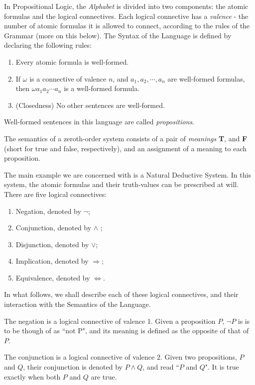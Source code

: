 In Propositional Logic, the \textit{Alphabet} is divided into two components: the atomic formulas and the logical connectives. Each logical connective has a \textit{valence} - the number of atomic formulas it is allowed to connect, according to the rules of the Grammar (more on this below). The Syntax of the Language is defined by declaring the following rules:
\begin{enumerate}
\item Every atomic formula is well-formed. 
\item If $\omega$ is a connective of valence $n$, and $a_1, a_2, \cdots, a_n$ are well-formed formulas, then $\omega a_1a_2\cdots a_n$ is a well-formed formula. 
\item (Closedness) No other sentences are well-formed.
\end{enumerate}
Well-formed sentences in this language are called \textit{propositions}.

The semantics of a zeroth-order system consists of a pair of \textit{meanings} \textbf{T}, and \textbf{F} (short for true and false, respectively), and an assignment of a meaning to each proposition. 

The main example we are concerned with is a Natural Deductive System. In this system, the atomic formulas and their truth-values can be prescribed at will. There are five logical connectives: 
\begin{enumerate}
\item Negation, denoted by $\neg$;  
\item Conjunction, denoted by $\land$ ; 
\item Disjunction, denoted by $\lor$; 
\item Implication, denoted by $\Rightarrow$; 
\item Equivalence, denoted by $\Leftrightarrow$.
\end{enumerate}
In what follows, we shall describe each of these logical connectives, and their interaction with the Semantics of the Language. 

\begin{definition}
The negation is a logical connective of valence 1. Given a proposition $P$, $\neg P$ is is to be though of as ``not P", and its meaning is defined as the opposite of that of $P$. 
\end{definition}


\begin{definition}
The conjunction is a logical connective of valence 2. Given two propositions, $P$ and $Q$, their conjunction is denoted by $P\land Q$, and read ``$P$ and $Q$".  It is true exactly when both $P$ and $Q$ are true. 
\end{definition}

